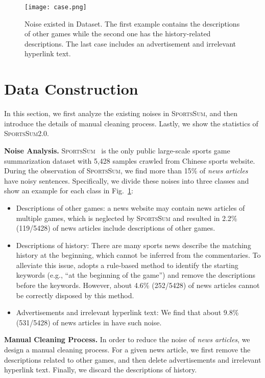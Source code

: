 \begin{figure}[t]
\centerline{\texttt{[image: case.png]}}
\caption{Noise existed in \sports Dataset. The first example contains the descriptions of other games while the second one has the history-related descriptions. The last case includes an advertisement and irrelevant hyperlink text.}
\label{noisy_samples}
\end{figure} 

\section{Data Construction}
In this section, we first analyze the existing noises in \textsc{SportsSum}, and then introduce the details of manual cleaning process. Lastly, we show the statistics of \textsc{SportsSum2.0}.

\vspace{1ex}
\noindent\textbf{Noise Analysis.}
\textsc{SportsSum}~\cite{Huang2020GeneratingSN} is the only public large-scale sports game summarization dataset with 5,428 samples crawled from Chinese sports website. During the observation of \textsc{SportsSum}, we find more than 15\% of \emph{news articles} have noisy sentences. Specifically, we divide these noises into three classes and show an example for each class in Fig.~\ref{noisy_samples}:
\begin{itemize}[leftmargin=*,topsep=0pt]
\item Descriptions of other games: a news website may contain news articles of multiple games, which is neglected by \textsc{SportsSum} and resulted in 2.2\% (119/5428) of news articles include descriptions of other games. 
\item Descriptions of history: There are many sports news describe the matching history at the beginning, which cannot be inferred from the commentaries. To alleviate this issue, \sports adopts a rule-based method to identify the starting keywords (e.g., ``at the beginning of the game'') and remove the descriptions before the keywords. However, about 4.6\% (252/5428) of news articles cannot be correctly disposed by this method.
\item Advertisements and irrelevant hyperlink text: We find that about 9.8\% (531/5428) of news articles in \sports have such noise.
\end{itemize}

\vspace{1ex}
\noindent\textbf{Manual Cleaning Process.}
In order to reduce the noise of \emph{news articles}, we design a manual cleaning process. For a given news article, we first remove the descriptions related to other games, and then delete advertisements and irrelevant hyperlink text. Finally, we discard the descriptions of history.

